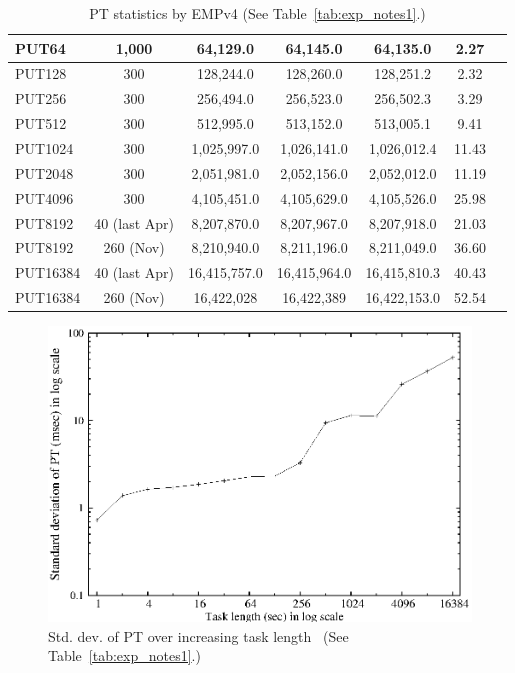 \documentclass[10pt]{article}
\begin{document}
\begin{table}[h]
{\begin{tabular}{|l|c|c|c|c|c|c|}
 PUT64 & 1,000 & 64,129.0 & 64,145.0 & 64,135.0 & 2.27 \\ \hline 


 PUT128 & 300 & 128,244.0 & 128,260.0 & 128,251.2 & 2.32\\ \hline

 PUT256 & 300 & 256,494.0 & 256,523.0 & 256,502.3 & 3.29\\ \hline

 PUT512 & 300 & 512,995.0 & 513,152.0 & 513,005.1 & 9.41\\ \hline

 PUT1024 & 300 & 1,025,997.0 & 1,026,141.0 & 1,026,012.4 & 11.43\\ \hline

 PUT2048 & 300 & 2,051,981.0 & 2,052,156.0 & 2,052,012.0 & 11.19\\ \hline

 PUT4096 & 300 & 4,105,451.0 & 4,105,629.0 & 4,105,526.0 & 25.98\\ \hline 

 PUT8192 & 40 (last Apr) & 8,207,870.0 & 8,207,967.0 & 8,207,918.0 & 21.03\\ \hline

 PUT8192 & 260 (Nov) & 8,210,940.0 & 8,211,196.0 & 8,211,049.0 & 36.60\\ \hline

 PUT16384 & 40 (last Apr) & 16,415,757.0 & 16,415,964.0 & 16,415,810.3 & 40.43\\ \hline

 PUT16384 & 260 (Nov) & 16,422,028 & 16,422,389 & 16,422,153.0 & 52.54\\ \hline
  \end{tabular}
  }

\caption{PT statistics by EMPv4 (See Table~\ref{tab:exp_notes1}.)\label{tab:empv4_stat}}
\end{table}

\begin{figure}[htp!]
	\centering
	\includegraphics[scale=0.8]{overall_pt_std.eps}
	\caption{Std. dev. of PT over increasing task length~ (See Table~\ref{tab:exp_notes1}.)\label{fig:incr_task_len}}
\end{figure}
\end{document}
